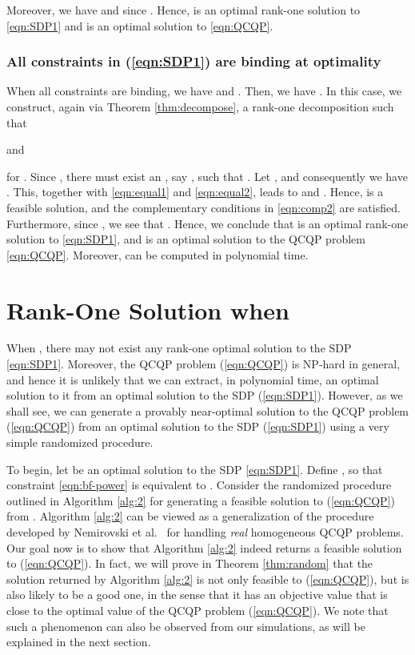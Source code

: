 \documentclass[twocolumn,10pt]{IEEEtran}
\theoremstyle{plain} \newtheorem{theorem}{Theorem}
\theoremstyle{plain} \newtheorem{proposition}{Proposition}
\theoremstyle{plain} \newtheorem{corollary}{Corollary}
\theoremstyle{remark} \newtheorem{remark}{Remark}
\theoremstyle{remark} \newtheorem{lemma}{Lemma}
\theoremstyle{plain} \newtheorem{definition}{Definition}
\theoremstyle{plain} \newtheorem{assumption}{Assumption}
\theoremstyle{plain} \newtheorem{fact}{Fact}
\begin{document}
Moreover, we have  and  since .  Hence,  is an optimal rank-one solution to \eqref{eqn:SDP1} and  is an optimal solution to \eqref{eqn:QCQP}.

\subsubsection{\textbf{All constraints in (\ref{eqn:SDP1}) are binding at optimality}}
When all constraints are binding, we have  and . Then, we have .  In this case, we construct, again via Theorem \ref{thm:decompose}, a rank-one decomposition  such that

and

for .  Since , there must exist an , say , such that . Let , and consequently we have .  This, together with \eqref{eqn:equal1} and \eqref{eqn:equal2}, leads to  and . Hence,  is a feasible solution, and the complementary conditions in \eqref{eqn:comp2} are satisfied. Furthermore, since , we see that .  Hence, we conclude that  is an optimal rank-one solution to \eqref{eqn:SDP1}, and  is an optimal solution to the QCQP problem \eqref{eqn:QCQP}. Moreover,  can be computed in polynomial time.

\section{Rank-One Solution when }\label{sec:largeK}
When , there may not exist any rank-one optimal solution to the SDP \eqref{eqn:SDP1}.  Moreover, the QCQP problem (\ref{eqn:QCQP}) is NP-hard in general, and hence it is unlikely that we can extract, in polynomial time, an optimal solution to it from an optimal solution to the SDP (\ref{eqn:SDP1}).  However, as we shall see, we can generate a provably near-optimal solution to the QCQP problem (\ref{eqn:QCQP}) from an optimal solution to the SDP (\ref{eqn:SDP1}) using a very simple randomized procedure.

To begin, let  be an optimal solution to the SDP \eqref{eqn:SDP1}.  Define , so that constraint \eqref{eqn:bf-power} is equivalent to .  Consider the randomized procedure outlined in Algorithm \ref{alg:2} for generating a feasible solution to (\ref{eqn:QCQP}) from .  Algorithm \ref{alg:2} can be viewed as a generalization of the procedure developed by Nemirovski et al.~\cite{NRT99} for handling {\it real} homogeneous QCQP problems.  Our goal now is to show that Algorithm \ref{alg:2} indeed returns a feasible solution to (\ref{eqn:QCQP}).  In fact, we will prove in Theorem \ref{thm:random} that the solution returned by Algorithm \ref{alg:2} is not only feasible to (\ref{eqn:QCQP}), but is also likely to be a good one, in the sense that it has an objective value that is close to the optimal value of the QCQP problem (\ref{eqn:QCQP}).  We note that such a phenomenon can also be observed from our simulations, as will be explained in the next section.
\end{document}
